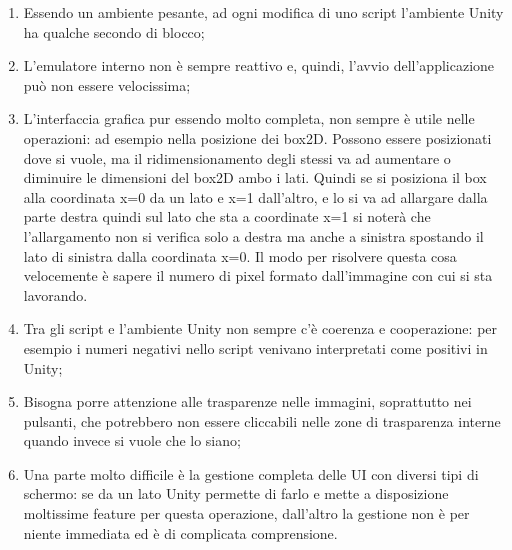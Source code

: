 \begin{enumerate}
\item Essendo un ambiente pesante, ad ogni modifica di uno script l’ambiente Unity ha qualche secondo di blocco;
\item L’emulatore interno non è sempre reattivo e, quindi, l’avvio dell’applicazione può non essere velocissima;
\item L’interfaccia grafica pur essendo molto completa, non sempre è utile nelle operazioni: ad esempio nella posizione dei box2D. Possono essere posizionati dove si vuole, ma il ridimensionamento degli stessi va ad aumentare o diminuire le dimensioni del box2D ambo i lati. Quindi se si posiziona il box alla coordinata x=0 da un lato e x=1 dall’altro, e lo si va ad allargare dalla parte destra quindi sul lato che sta a coordinate x=1 si noterà che l’allargamento non si verifica solo a destra ma anche a sinistra spostando il lato di sinistra dalla coordinata x=0. Il modo per risolvere questa cosa velocemente è sapere il numero di pixel formato dall’immagine con cui si sta lavorando.
\item Tra gli script e l’ambiente Unity non sempre c’è coerenza e cooperazione: per esempio i numeri negativi nello script venivano interpretati come positivi in Unity;
\item Bisogna porre attenzione alle trasparenze nelle immagini, soprattutto nei pulsanti, che potrebbero non essere cliccabili nelle zone di trasparenza interne quando invece si vuole che lo siano;
\item Una parte molto difficile è la gestione completa delle UI con diversi tipi di schermo: se da un lato Unity permette di farlo e mette a disposizione moltissime feature per questa operazione, dall’altro la gestione non è per niente immediata ed è di complicata comprensione.
\end{enumerate}
